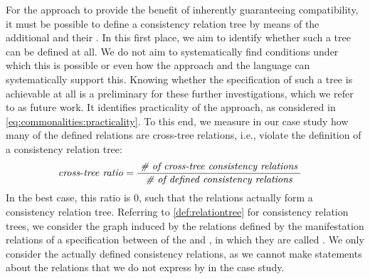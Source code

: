 For the \commonalities approach to provide the benefit of inherently guaranteeing compatibility, it must be possible to define a consistency relation tree by means of the additional \conceptmetamodels and their \commonalities.
In this first place, we aim to identify whether such a tree can be defined at all.
We do not aim to systematically find conditions under which this is possible or even how the \commonalities approach and the \commonalities language can systematically support this.
Knowing whether the specification of such a tree is achievable at all is a preliminary for these further investigations, which we refer to as future work.
It identifies practicality of the approach, as considered in \autoref{eq:commonalities:practicality}.
To this end, we measure in our case study how many of the defined relations are cross-tree relations, i.e., violate the definition of a consistency relation tree:
\begin{align*}
    &
    \mathit{cross\mbox{-}tree\ ratio} = \frac{\; \textit{\# of cross-tree consistency relations} \;}{\; \textit{\# of defined consistency relations} \;}
\end{align*}
In the best case, this ratio is $0$, such that the relations actually form a consistency relation tree.
Referring to \autoref{def:relationtree} for consistency relation trees, we consider the graph induced by the relations defined by the manifestation relations of a \commonalities specification between \metaclasses of the \concretemetamodels and \conceptmetamodels, in which they are called \commonalities.
We only consider the actually defined consistency relations, as we cannot make statements about the relations that we do not express by \commonalities in the case study.

